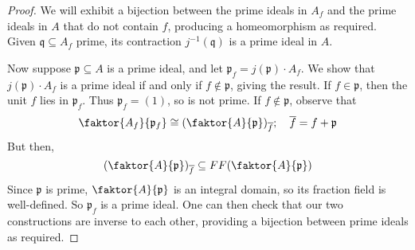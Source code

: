 \begin{proof}
    We will exhibit a bijection between the prime ideals in \( A_f \) and the prime ideals in \( A \) that do not contain \( f \), producing a homeomorphism as required.
    Given \( \mathfrak q \subseteq A_f \) prime, its contraction \( j^{-1}(\mathfrak q) \) is a prime ideal in \( A \).

    Now suppose \( \mathfrak p \subseteq A \) is a prime ideal, and let \( \mathfrak p_f = j(\mathfrak p) \cdot A_f \).
    We show that \( j(\mathfrak p) \cdot A_f \) is a prime ideal if and only if \( f \notin \mathfrak p \), giving the result.
    If \( f \in \mathfrak p \), then the unit \( f \) lies in \( \mathfrak p_f \).
    Thus \( \mathfrak p_f = (1) \), so is not prime.
    If \( f \notin \mathfrak p \), observe that
    \[ \faktor{A_f}{\mathfrak p_f} \cong \qty(\faktor{A}{\mathfrak p})_{\overline f};\quad \overline f = f + \mathfrak p \]
    But then,
    \[ \qty(\faktor{A}{\mathfrak p})_{\overline f} \subseteq FF\qty(\faktor{A}{\mathfrak p}) \]
    Since \( \mathfrak p \) is prime, \( \faktor{A}{\mathfrak p} \) is an integral domain, so its fraction field is well-defined.
    So \( \mathfrak p_f \) is a prime ideal.
    One can then check that our two constructions are inverse to each other, providing a bijection between prime ideals as required.
\end{proof}
